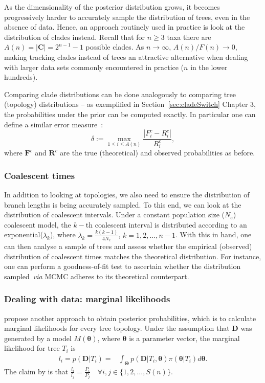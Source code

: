 As the dimensionality of the posterior distribution grows, it becomes progressively harder to accurately sample the distribution of trees, even in the absence of data.
Hence, an approach routinely used in practice is look at the distribution of clades instead.
Recall that for $n \geq 3$ taxa there are $ A(n) = |\boldsymbol C| = 2^{n-1} -1$ possible clades. 
As $n \rightarrow \infty$, $A(n)/F(n) \rightarrow 0$, making tracking clades instead of trees an attractive alternative when dealing with larger data sets commonly encountered in practice ($n$ in the lower hundreds).

Comparing clade distributions can be done analogously to comparing tree (topology) distributions  -- as exemplified in Section~\ref{sec:cladeSwitch} Chapter 3, the probabilities under the prior can be computed exactly.
In particular one can define a similar error measure~\citep{Hoehna2008}:
\[ \delta := \max_{1 \leq i \leq A(n)} \frac{|F^c_i - R^c_i|}{R^c_i}, \]
where $\boldsymbol F^c$ and $\boldsymbol R^c$ are the true (theoretical) and observed probabilities as before.

\subsubsection{Coalescent times}

In addition to looking at topologies, we also need to ensure the distribution of branch lengths is being accurately sampled.
To this end, we can look at the distribution of coalescent intervals.
Under a constant population size ($N_e$) coalescent model, the $k-$th coalescent interval is distributed according to an exponential($\lambda_k$), where $\lambda_k = \frac{k(k-1)}{4N_e}$, $k = 1, 2, ..., n-1$.
With this in hand, one can then analyse a sample of trees and assess whether the empirical (observed) distribution of coalescent times matches the theoretical distribution.
For instance, one can perform a goodness-of-fit test to ascertain whether the distribution sampled~\textit{via} MCMC adheres to its theoretical counterpart.

\subsubsection{Dealing with data: marginal likelihoods}

\cite{Hoehna2008} propose another approach to obtain posterior probabilities, which is to calculate marginal likelihoods for every tree topology.
Under the assumption that $\boldsymbol D$ was generated by a model $M(\boldsymbol \theta)$, where $\boldsymbol \theta$ is a parameter vector, the marginal likelihood for tree $T_i$ is
\begin{align}
 \label{eq:margLike}
 l_i = p(\boldsymbol D | T_i) = & \int_{\boldsymbol \Theta} p(\boldsymbol D | T_i, \boldsymbol \theta) \pi(\boldsymbol \theta | T_i)d\boldsymbol \theta. 
\end{align}
The claim by \cite{Hoehna2008} is that $\frac{l_i}{l_j} = \frac{P_i}{P_j} \quad \forall i, j \in \{1, 2, \ldots, S(n)\}$.

